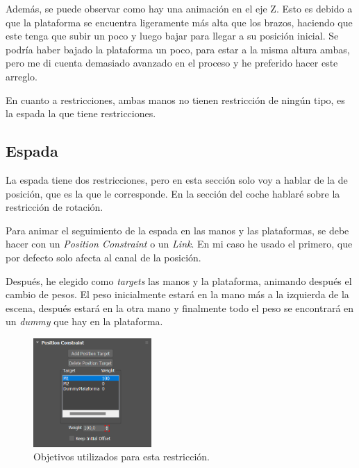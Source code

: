 \bigskip

Además, se puede observar como hay una animación en el eje Z. Esto es debido a que la plataforma se encuentra ligeramente más alta que los brazos, haciendo que este tenga que subir un poco y luego bajar para llegar a su posición inicial. Se podría haber bajado la plataforma un poco, para estar a la misma altura ambas, pero me di cuenta demasiado avanzado en el proceso y he preferido hacer este arreglo.

\bigskip

En cuanto a restricciones, ambas manos no tienen restricción de ningún tipo, es la espada la que tiene restricciones.


\subsection{Espada}


La espada tiene dos restricciones, pero en esta sección solo voy a hablar de la de posición, que es la que le corresponde. En la sección del coche hablaré sobre la restricción de rotación.

\bigskip

Para animar el seguimiento de la espada en las manos y las plataformas, se debe hacer con un \textit{Position Constraint} o un \textit{Link}. En mi caso he usado el primero, que por defecto solo afecta al canal de la posición.

\bigskip

Después, he elegido como \textit{targets} las manos y la plataforma, animando después el cambio de pesos. El peso inicialmente estará en la mano más a la izquierda de la escena, después estará en la otra mano y finalmente todo el peso se encontrará en un \textit{dummy} que hay en la plataforma.

\begin{figure}[H]
    \centering
    \includegraphics[width=0.4\textwidth]{imagenes/espada/pesosPC.png}
    \caption{Objetivos utilizados para esta restricción.}
 \end{figure}


